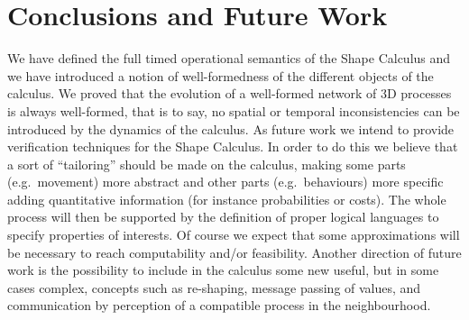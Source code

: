 \documentclass[11pt]{article}
\begin{document}
\section{Conclusions and Future Work}
\label{sec:conclusion}

We have defined the full timed operational semantics of the Shape Calculus and we have introduced a notion of well-formedness of the different objects of the calculus. We proved that the evolution of a well-formed network of 3D processes is always well-formed, that is to say, no spatial or temporal inconsistencies can be introduced by the dynamics of the calculus. As future work we intend to provide verification techniques for the Shape Calculus. In order to do this we believe that a sort of ``tailoring'' should be made on the calculus, making some parts (e.g.\ movement) more abstract and other parts (e.g.\ behaviours) more specific adding quantitative information (for instance probabilities or costs). The whole process will then be supported by the definition of proper logical languages to specify properties of interests. Of course we expect that some approximations will be necessary to reach computability and/or feasibility. Another direction of future work is the possibility to include in the calculus some new useful, but in some cases complex, concepts such as re-shaping, message passing of values, and communication by perception of a compatible process in the neighbourhood.




\newpage
\end{document}
